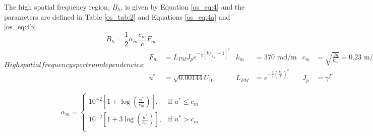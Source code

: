 \renewcommand{\baselinestretch}{2} \small\normalsize
The high spatial frequency region, $B_h$, is given by Equation \ref{os_eq:4} and the parameters are defined in Table \ref{os_tab:2} and Equations \ref{os_eq:4a} and \ref{os_eq:4b}.
\begin{equation}
  \label{os_eq:4}
 B_h = \frac{1}{2} \alpha_m \frac{c_m}{c} F_m
\end{equation}
\renewcommand{\baselinestretch}{2} \small\normalsize
\begin{subequations}
\label{os_eq:4a}
   High spatial frequency spectrum dependencies:
\begin{align}
  F_m &= L_{PM}J_pe^{-\frac{1}{4}\left[k/_{k_m} - 1 \right]^2 } & k_m & = 370 \text{ rad/m} &  c_m &=\sqrt{\frac{2g}{k_m}} = 0.23 \text{ m/s} \\
  u^* &= \sqrt{0.00144}U_{10}  & L_{PM} &=e^{-\frac{5}{4}\left(\frac{k_p}{k} \right)^2}  &  J_p &= \gamma^\Gamma
\end{align}
\end{subequations}
\renewcommand{\baselinestretch}{2} \small\normalsize

\begin{equation}
\begin{gathered}
  \label{os_eq:4b}
   \alpha_m= \begin{cases}
    10^{-2}\left[1 + \log\left(\frac{u^*}{c_m} \right) \right],& \text{if } u^* \leq c_m\\
    10^{-2}\left[1 + 3\log\left(\frac{u^*}{c_m} \right) \right], & \text{if } u^* > c_m\\
  \end{cases}
\end{gathered}
\end{equation}
\renewcommand{\baselinestretch}{2} \small\normalsize


